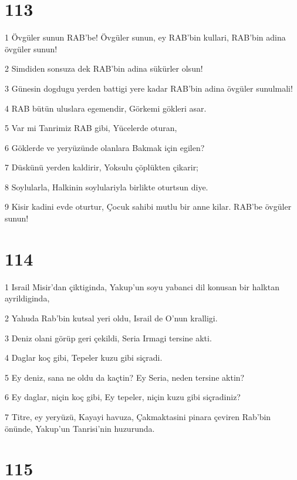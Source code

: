 \chapter{113}

\par 1 Övgüler sunun RAB'be! Övgüler sunun, ey RAB'bin kullari, RAB'bin adina övgüler sunun!
\par 2 Simdiden sonsuza dek RAB'bin adina sükürler olsun!
\par 3 Günesin dogdugu yerden battigi yere kadar RAB'bin adina övgüler sunulmali!
\par 4 RAB bütün uluslara egemendir, Görkemi gökleri asar.
\par 5 Var mi Tanrimiz RAB gibi, Yücelerde oturan,
\par 6 Göklerde ve yeryüzünde olanlara Bakmak için egilen?
\par 7 Düskünü yerden kaldirir, Yoksulu çöplükten çikarir;
\par 8 Soylularla, Halkinin soylulariyla birlikte oturtsun diye.
\par 9 Kisir kadini evde oturtur, Çocuk sahibi mutlu bir anne kilar. RAB'be övgüler sunun!

\chapter{114}

\par 1 Israil Misir'dan çiktiginda, Yakup'un soyu yabanci dil konusan bir halktan ayrildiginda,
\par 2 Yahuda Rab'bin kutsal yeri oldu, Israil de O'nun kralligi.
\par 3 Deniz olani görüp geri çekildi, Seria Irmagi tersine akti.
\par 4 Daglar koç gibi, Tepeler kuzu gibi siçradi.
\par 5 Ey deniz, sana ne oldu da kaçtin? Ey Seria, neden tersine aktin?
\par 6 Ey daglar, niçin koç gibi, Ey tepeler, niçin kuzu gibi siçradiniz?
\par 7 Titre, ey yeryüzü, Kayayi havuza, Çakmaktasini pinara çeviren Rab'bin önünde, Yakup'un Tanrisi'nin huzurunda.

\chapter{115}

